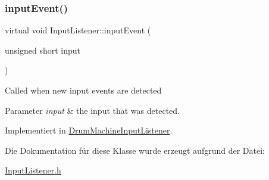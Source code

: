 \subsubsection{\texorpdfstring{input\+Event()}{inputEvent()}}
{\footnotesize\ttfamily virtual void Input\+Listener\+::input\+Event (\begin{DoxyParamCaption}\item[{unsigned short}]{input }\end{DoxyParamCaption})\hspace{0.3cm}{\ttfamily [pure virtual]}}

Called when new input events are detected 
\begin{DoxyParams}{Parameter}
{\em input} & the input that was detected. \\
\hline
\end{DoxyParams}


Implementiert in \hyperlink{class_drum_machine_input_listener_a44a620b09b35885a26befe84fa6e1ab0}{Drum\+Machine\+Input\+Listener}.



Die Dokumentation für diese Klasse wurde erzeugt aufgrund der Datei\+:\begin{DoxyCompactItemize}
\item 
\hyperlink{_input_listener_8h}{Input\+Listener.\+h}\end{DoxyCompactItemize}
